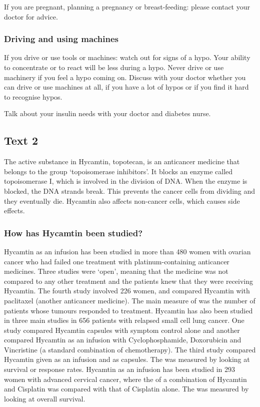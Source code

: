 \documentclass[output=paper]{langsci/langscibook}
\begin{document}
If you are pregnant, planning a pregnancy or breast-feeding: please contact your doctor for advice.

\subsubsection*{Driving and using machines}

If you drive or use tools or machines: watch out for signs of a hypo. Your ability to concentrate or to react will be less during a hypo. Never drive or use machinery if you feel a hypo coming on. Discuss with your doctor whether you can drive or use machines at all, if you have a lot of hypos or if you find it hard to recognise hypos.

Talk about your insulin needs with your doctor and diabetes nurse.

\subsection*{Text 2}

The active substance in Hycamtin, topotecan, is an anticancer medicine that belongs to the group 
‘topoisomerase inhibitors’. It blocks an enzyme called topoisomerase I, which is involved in the 
division of DNA. When the enzyme is blocked, the DNA strands break. This prevents the cancer cells 
from dividing and they eventually die. Hycamtin also affects non-cancer cells, which causes side 
effects.
\subsubsection*{How has Hycamtin been studied?} 
Hycamtin as an infusion has been studied in more than 480 women with ovarian cancer who had failed one treatment with platinum-containing anticancer medicines. Three studies were ‘open’, meaning that the medicine was not compared to any other treatment and the patients knew that they were receiving Hycamtin. The fourth study involved 226 women, and compared Hycamtin with paclitaxel (another anticancer medicine). The main measure of  was the number of patients whose tumours responded to treatment. 
Hycamtin has also been studied in three main studies in 656 patients with relapsed small cell lung cancer. One study compared Hycamtin capsules with symptom control alone and another compared Hycamtin as an infusion with Cyclophosphamide, Doxorubicin and Vincristine (a standard combination of chemotherapy). The third study compared Hycamtin given as an infusion and as capsules. The  was measured by looking at survival or response rates.
Hycamtin as an infusion has been studied in 293 women with advanced cervical cancer, where the  of a combination of Hycamtin and Cisplatin was compared with that of Cisplatin alone. The  was measured by looking at overall survival.
\end{document}
